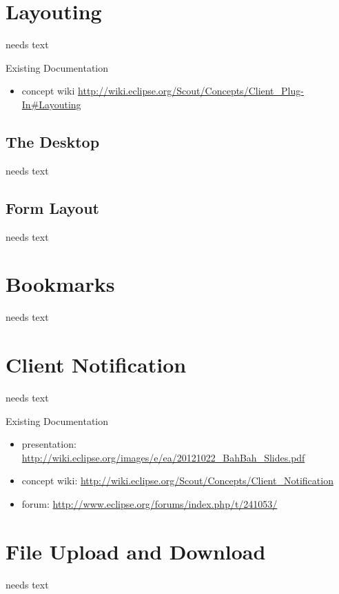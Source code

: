 \documentclass[a4paper,10pt,twoside]{book}
\begin{document}
\chapter{Layouting}
needs text

\noindent Existing Documentation
\begin{itemize}
  \item concept wiki \url{http://wiki.eclipse.org/Scout/Concepts/Client_Plug-In#Layouting}
\end{itemize}

\section{The Desktop}
needs text

\section{Form Layout}
needs text


\chapter{Bookmarks}
needs text

\chapter{Client Notification}
needs text

\noindent Existing Documentation
\begin{itemize}
  \item presentation: \url{http://wiki.eclipse.org/images/e/ea/20121022_BahBah_Slides.pdf}
  \item concept wiki: \url{http://wiki.eclipse.org/Scout/Concepts/Client_Notification}
  \item forum: \url{http://www.eclipse.org/forums/index.php/t/241053/}
\end{itemize}
      
\chapter{File Upload and Download}
needs text
\end{document}

